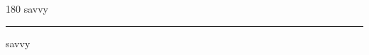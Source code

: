 
\begin{frame}
\begin{center}
\begin{turn}{180}
{\fontsize{2.5cm}{1em}\selectfont savvy}
\end{turn}
\vspace{1em}\par  
\hrule
\vspace{1em}\par  
{\fontsize{2.5cm}{1em}\selectfont savvy}
\end{center}
\end{frame}
